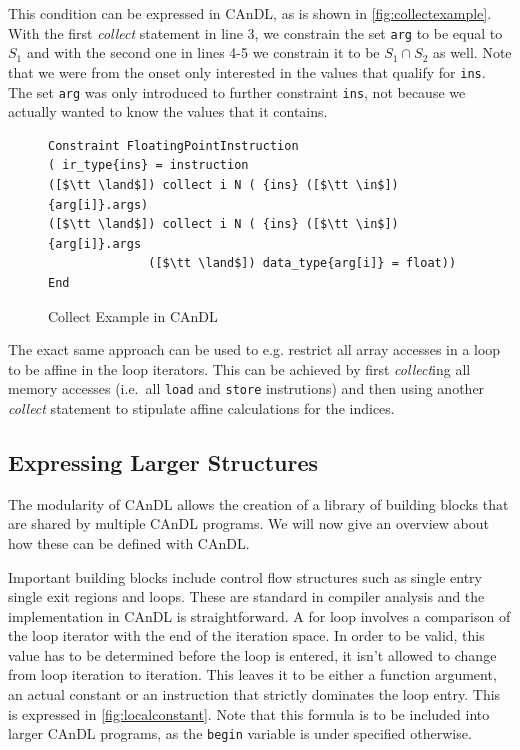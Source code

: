     This condition can be expressed in CAnDL, as is shown in
    \autoref{fig:collectexample}.
    With the first {\it collect} statement in line 3, we constrain the set
    \texttt{arg} to be equal to $S_1$ and with the second one in lines 4-5 we
    constrain it to be $S_1\cap S_2$ as well.
    Note that we were from the onset only interested in the values that qualify
    for \texttt{ins}.
    The set \texttt{arg} was only introduced to further constraint \texttt{ins},
    not because we actually wanted to know the values that it contains.

\begin{figure}[ht]
\begin{lstlisting}[language=CAnDL]
Constraint FloatingPointInstruction
( ir_type{ins} = instruction
([$\tt \land$]) collect i N ( {ins} ([$\tt \in$]) {arg[i]}.args)
([$\tt \land$]) collect i N ( {ins} ([$\tt \in$]) {arg[i]}.args
              ([$\tt \land$]) data_type{arg[i]} = float))
End
\end{lstlisting}
\vspace{-0.3cm}
\caption{Collect Example in CAnDL}
\label{fig:collectexample}
\end{figure}

    The exact same approach can be used to e.g. restrict all array accesses in a
    loop to be affine in the loop iterators.
    This can be achieved by first {\it collect}ing all memory accesses
    (i.e.\ all \texttt{load} and \texttt{store} instrutions) and then using
    another {\it collect} statement to stipulate affine calculations for the
    indices.

\subsection{Expressing Larger Structures}

    The modularity of CAnDL allows the creation of a library of building blocks
    that are shared by multiple CAnDL programs.
    We will now give an overview about how these can be defined with CAnDL.

    Important building blocks include control flow structures such as single
    entry single exit regions and loops.
    These are standard in compiler analysis and the implementation in CAnDL is
    straightforward.
    A for loop involves a comparison of the loop iterator with the end of the
    iteration space.
    In order to be valid, this value has to be determined before the loop is
    entered, it isn't allowed to change from loop iteration to iteration.
    This leaves it to be either a function argument, an actual constant or an
    instruction that strictly dominates the loop entry.
    This is expressed in \autoref{fig:localconstant}.
    Note that this formula is to be included into larger CAnDL programs, as the
    \texttt{begin} variable is under specified otherwise.

